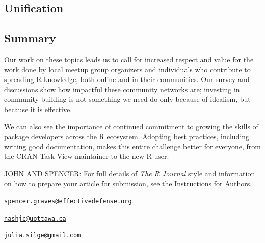 \subsection{Unification}\label{unification}

\subsection{Summary}\label{summary}

Our work on these topics leads us to call for increased respect and
value for the work done by local meetup group organizers and individuals
who contribute to spreading R knowledge, both online and in their
communities. Our survey and discussions show how impactful these
community networks are; investing in community building is not something
we need do only because of idealism, but because it is effective.

We can also see the importance of continued commitment to growing the
skills of package developers across the R ecosystem. Adopting best
practices, including writing good documentation, makes this entire
challenge better for everyone, from the CRAN Task View maintainer to the
new R user.

JOHN AND SPENCER: For full details of \emph{The R Journal} style and
information on how to prepare your article for submission, see the
\href{https://journal.r-project.org/share/author-guide.pdf}{Instructions
for Authors}. 

\address{%
Spencer Graves\\
EffectiveDefense.org\\
line 1\\ line 2\\
}
\href{mailto:spencer.graves@effectivedefense.org}{\nolinkurl{spencer.graves@effectivedefense.org}}

\address{%
John C. Nash\\
University of Ottawa\\
line 1\\ line 2\\
}
\href{mailto:nashjc@uottawa.ca}{\nolinkurl{nashjc@uottawa.ca}}

\address{%
Julia Silge\\
Stack Overflow\\
110 William Street, Floor 28\\ New York City, NY 10038\\
}
\href{mailto:julia.silge@gmail.com}{\nolinkurl{julia.silge@gmail.com}}

